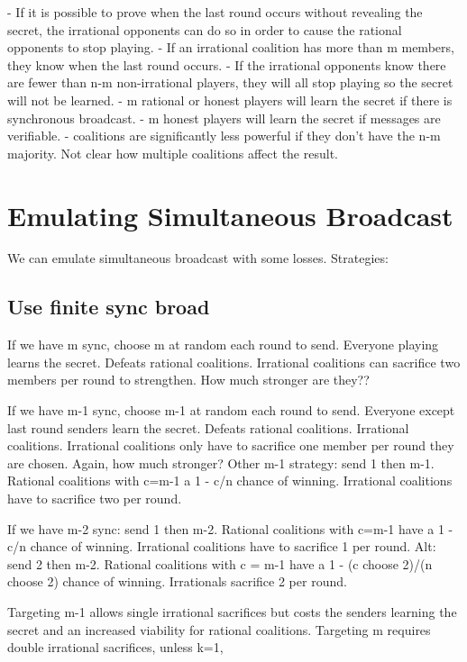\documentclass{article}
\begin{document}
- If it is possible to prove when the last round occurs without revealing the secret, the irrational opponents can do so in order to cause the rational opponents to stop playing.
- If an irrational coalition has more than m members, they know when the last round occurs.
- If the irrational opponents know there are fewer than n-m non-irrational players, they will all stop playing so the secret will not be learned.
- m rational or honest players will learn the secret if there is synchronous broadcast.
- m honest players will learn the secret if messages are verifiable.
- coalitions are significantly less powerful if they don't have the n-m majority. Not clear how multiple coalitions affect the result.

\section{Emulating Simultaneous Broadcast}

We can emulate simultaneous broadcast with some losses. Strategies:

\subsection{Use finite sync broad}
If we have m sync, choose m at random each round to send. Everyone playing learns the secret. Defeats rational coalitions. Irrational coalitions can sacrifice two members per round to strengthen. How much stronger are they??

If we have m-1 sync, choose m-1 at random each round to send. Everyone except last round senders learn the secret. Defeats rational coalitions. Irrational coalitions. Irrational coalitions only have to sacrifice one member per round they are chosen. Again, how much stronger?
Other m-1 strategy: send 1 then m-1. Rational coalitions with c=m-1 a 1 - c/n chance of winning. Irrational coalitions have to sacrifice two per round.

If we have m-2 sync: send 1 then m-2. Rational coalitions with c=m-1 have a 1 - c/n chance of winning. Irrational coalitions have to sacrifice 1 per round.
Alt: send 2 then m-2. Rational coalitions with c = m-1 have a 1 - (c choose 2)/(n choose 2) chance of winning. Irrationals sacrifice 2 per round.

Targeting m-1 allows single irrational sacrifices but costs the senders learning the secret and an increased viability for rational coalitions.
Targeting m requires double irrational sacrifices, unless k=1,  
\end{document}
